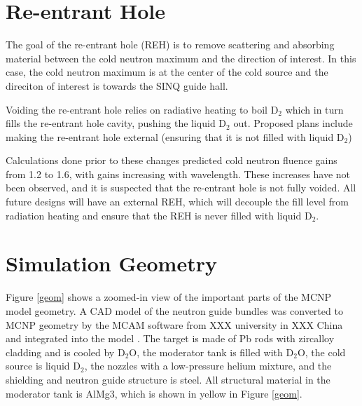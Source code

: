 \documentclass[a4paper]{jpconf}
\begin{document}
\section{Re-entrant Hole}

The goal of the re-entrant hole (REH) is to remove scattering and absorbing material between the cold neutron maximum and the direction of interest.  In this case, the cold neutron maximum is at the center of the cold source and the direciton of interest is towards the SINQ guide hall.  

Voiding the re-entrant hole relies on radiative heating to boil D$_2$ which in turn fills the re-entrant hole cavity, pushing the liquid D$_2$ out.  Proposed plans include making the re-entrant hole external (ensuring that it is not filled with liquid D$_2$)

Calculations done prior to these changes predicted cold neutron fluence gains from 1.2 to 1.6, with gains increasing with wavelength. These increases have not been observed, and it is suspected that the re-entrant hole is not fully voided.  All future designs will have an external REH, which will decouple the fill level from radiation heating and ensure that the REH is never filled with liquid D$_2$.

\section{Simulation Geometry}

Figure \ref{geom} shows a zoomed-in view of the important parts of the MCNP model geometry.  A CAD model of the neutron guide bundles was converted to MCNP geometry by the MCAM software from XXX university in XXX China and integrated into the model \cite{mcam}.  The target is made of Pb rods with zircalloy cladding and is cooled by D$_2$O, the moderator tank is filled with D$_2$O, the cold source is liquid D$_2$, the nozzles with a low-pressure helium mixture, and the shielding and neutron guide structure is steel.  All structural material in the moderator tank is AlMg3, which is shown in yellow in Figure \ref{geom}.
\end{document}
